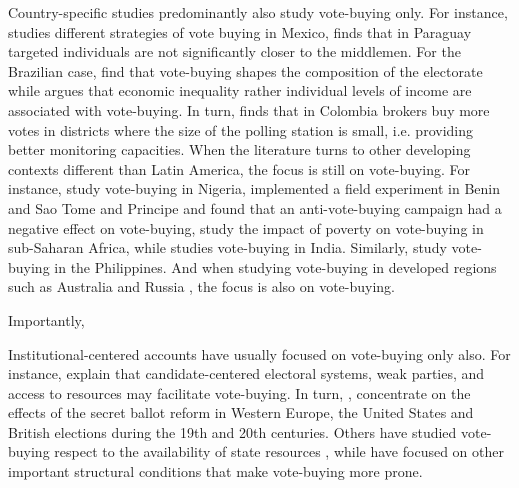 \documentclass[onesided]{article}\usepackage[]{graphicx}\usepackage[]{color}
\begin{document}
Country-specific studies predominantly also study vote-buying only. For instance, \textcite{Diaz-Cayeros2012} studies different strategies of vote buying in Mexico, \textcite{Inan2012a} finds that in Paraguay targeted individuals are not significantly closer to the middlemen. For the Brazilian case, \textcite{Hidalgo2012,Hidalgo2016} find that vote-buying shapes the composition of the electorate while \textcite{Bahamonde2018} argues that economic inequality rather individual levels of income are associated with vote-buying. In turn, \textcite{Rueda2016} finds that in Colombia brokers buy more votes in districts where the size of the polling station is small, i.e. providing better monitoring capacities. When the literature turns to other developing contexts different than Latin America, the focus is still on vote-buying. For instance, \textcite{Bratton2008a,Rueda2014a} study vote-buying in Nigeria, \textcite{Vicente2009,Vicente2014} implemented a field experiment in Benin and Sao Tome and Principe and found that an anti-vote-buying campaign had a negative effect on vote-buying, \textcite{Jensen2013a} study the impact of poverty on vote-buying in sub-Saharan Africa, while \textcite{Heath2018} studies vote-buying in India. Similarly, \parencite{Khemani2015,Hicken2015,Hicken2018} study vote-buying in the Philippines. And when studying vote-buying in developed regions such as  Australia \parencite{Denemark2021} and Russia \parencite{Saikkonen2021}, the focus is also on vote-buying. 



Importantly,  \textcite{Gonzalez-Ocantos2012,GonzalezOcantos2014,KiewietDeJonge2015,Bahamonde2020a}





Institutional-centered accounts have usually focused on vote-buying only also. For instance, \textcite{Hicken2007} explain that candidate-centered electoral systems, weak parties, and access to resources may facilitate vote-buying. In turn, \textcite{Aidt2011}, concentrate on the effects of the secret ballot reform in Western Europe, the United States and British elections \textcite{Kam2016a} during the 19th and 20th centuries. Others have studied vote-buying respect to the availability of state resources \textcite{Gherghina2021a}, while \textcite{Kitschelt2000,Kitschelt2007,Kitschelt2015} have focused on other important structural conditions that make vote-buying more prone.


\end{document}
